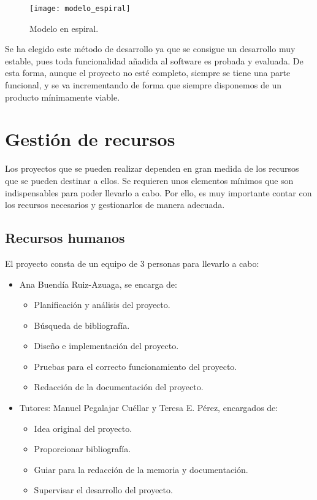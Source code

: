 \begin{figure}
\begin{center}
\caption{Modelo en espiral.}
\label{modelo_espiral}
\texttt{[image: modelo\_espiral]}
\end{center}
\end{figure}

Se ha elegido este método de desarrollo ya que se consigue un desarrollo muy estable, pues toda funcionalidad añadida al software es probada y evaluada. De esta forma, aunque el proyecto no esté completo, siempre se tiene una parte funcional, y se va incrementando de forma que siempre disponemos de un producto mínimamente viable. 

\section{Gestión de recursos}

Los proyectos que se pueden realizar dependen en gran medida de los recursos que se pueden destinar a ellos. Se requieren unos elementos mínimos que son indispensables para poder llevarlo a cabo. Por ello, es muy importante contar con los recursos necesarios y gestionarlos de manera adecuada.

\subsection{Recursos humanos}

El proyecto consta de un equipo de 3 personas para llevarlo a cabo:

\begin{itemize}
\item Ana Buendía Ruiz-Azuaga, se encarga de:
	\begin{itemize}
	\item Planificación y análisis del proyecto.
	\item Búsqueda de bibliografía.
	\item Diseño e implementación del proyecto.
	\item Pruebas para el correcto funcionamiento del proyecto.
	\item Redacción de la documentación del proyecto.
	\end{itemize}
\item Tutores: Manuel Pegalajar Cuéllar y Teresa E. Pérez, encargados de:
	\begin{itemize}
	\item Idea original del proyecto.
	\item Proporcionar bibliografía.
	\item Guiar para la redacción de la memoria y documentación.
	\item Supervisar el desarrollo del proyecto.
	\end{itemize}
\end{itemize}

